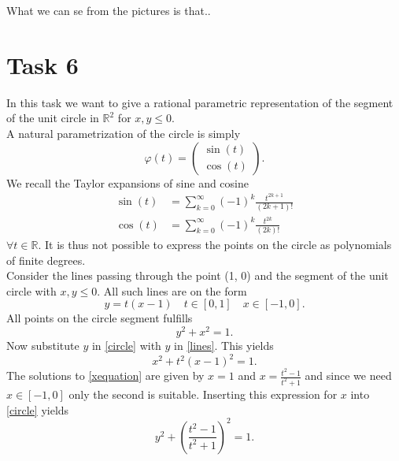 \documentclass[]{article}
\begin{document}
What we can se from the pictures is that..

\begin{figure}[h!]
\end{figure}


\section*{Task 6}
In this task we want to give a rational parametric representation of the segment of the unit circle in $\mathbb{R}^2$ for $x, y \leq 0$.\\
A natural parametrization of the circle is simply\begin{equation*}
\varphi(t) = \left(\begin{array}{c}
\sin(t)\\
\cos(t)
\end{array}\right).
\end{equation*}
We recall the Taylor expansions of sine and cosine\begin{equation}
\begin{aligned}
\sin(t) &= \sum_{k=0}^{\infty}(-1)^k\frac{t^{2k+1}}{(2k+1)!}\\
\cos(t) &= \sum_{k=0}^{\infty}(-1)^k\frac{t^{2k}}{(2k)!}
\end{aligned}
\end{equation}
$\forall t\in\mathbb{R}$. It is thus not possible to express the points on the circle as polynomials of finite degrees.\\
Consider the lines passing through the point (1, 0) and the segment of the unit circle with $x, y\leq 0$. All such lines are on the form \begin{equation}\label{lines}
y=t(x-1)\quad t\in[0, 1]\quad x\in[-1, 0].
\end{equation}
All points on the circle segment fulfills \begin{equation}\label{circle}
y^2 + x^2 = 1.
\end{equation} 
Now substitute $y$ in \eqref{circle} with $y$ in \eqref{lines}. This yields\begin{equation}\label{xequation}
x^2 + t^2(x - 1)^2 = 1.
\end{equation}
The solutions to \eqref{xequation} are given by $x=1$ and $x=\frac{t^2 - 1}{t^2 + 1}$ and since we need $x\in [-1, 0]$ only the second is suitable. Inserting this expression for $x$ into \eqref{circle} yields\begin{equation}\label{yequation}
y^2 + \left(\frac{t^2 - 1}{t^2 + 1}\right)^2 = 1.
\end{equation}
\end{document}
